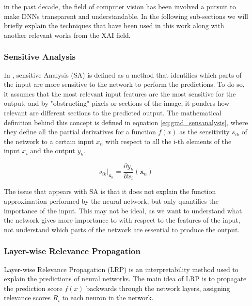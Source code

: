 in the past decade, the field of computer vision has been involved a pursuit to make DNNs transparent and understandable. In the following sub-sections we will briefly explain the techniques that have been used in this work along with another relevant works from the XAI field.

\subsubsection{Sensitive Analysis}

In \cite{xai_survey2019, sensitivity_analysis}, sensitive Analysis (SA) is defined as a method that identifies which parts of the input are more sensitive to the network to perform the predictions. To do so, it assumes that the most relevant input features are the most sensitive for the output, and by "obstructing" pixels or sections of the image, it ponders how relevant are different sections to the predicted output. The mathematical definition behind this concept is defined in equation \ref{eq:grad_sensanalysis}, where they define all the partial derivatives for a function $f(x)$ as the sensitivity $s_{ik}$ of the network to a certain input $x_n$ with respect to all the i-th elements of the input $x_i$ and the output $y_k$.

\begin{equation}
	\label{eq:grad_sensanalysis}
	s_{ik} \bigg|_{\mathbf{x}_n} = \frac{\partial y_k}{\partial x_i} (\mathbf{x}_n)
\end{equation}

The issue that appears with SA is that it does not explain the function approximation performed by the neural network, but only quantifies the importance of the input. This may not be ideal, as we want to understand what the network gives more importance to with respect to the features of the input, not understand which parts of the network are essential to produce the output.

\subsubsection{Layer-wise Relevance Propagation}
Layer-wise Relevance Propagation (LRP) \cite{bach2015pixel} is an interpretability method used to explain the predictions of neural networks. The main idea of LRP is to propagate the prediction score $f(x)$ backwards through the network layers, assigning relevance scores $R_i$ to each neuron in the network.

